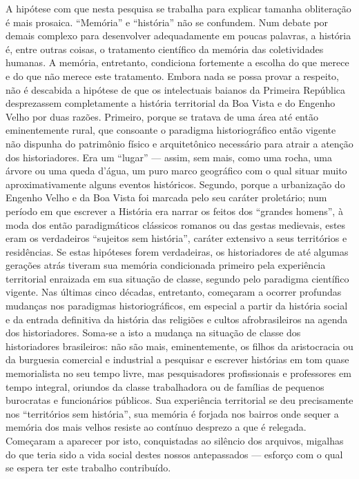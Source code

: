 A hipótese com que nesta pesquisa se trabalha para explicar tamanha obliteração é mais prosaica. ``Memória'' e ``história'' não se confundem. Num debate por demais complexo para desenvolver adequadamente em poucas palavras, a história é, entre outras coisas, o tratamento científico da memória das coletividades humanas. A memória, entretanto, condiciona fortemente a escolha do que merece e do que não merece este tratamento. Embora nada se possa provar a respeito, não é descabida a hipótese de que os intelectuais baianos da Primeira República desprezassem completamente a história territorial da Boa Vista e do Engenho Velho por duas razões. Primeiro, porque se tratava de uma área até então eminentemente rural, que consoante o paradigma historiográfico então vigente não dispunha do patrimônio físico e arquitetônico necessário para atrair a atenção dos historiadores. Era um ``lugar'' --- assim, sem mais, como uma rocha, uma árvore ou uma queda d'água, um puro marco geográfico com o qual situar muito aproximativamente alguns eventos históricos. Segundo, porque a urbanização do Engenho Velho e da Boa Vista foi marcada pelo seu caráter proletário; num período em que escrever a História era narrar os feitos dos ``grandes homens'', à moda dos então paradigmáticos clássicos romanos ou das gestas medievais, estes eram os verdadeiros ``sujeitos sem história'', caráter extensivo a seus territórios e residências. Se estas hipóteses forem verdadeiras, os historiadores de até algumas gerações atrás tiveram sua memória condicionada primeiro pela experiência territorial enraizada em sua situação de classe, segundo pelo paradigma científico vigente. Nas últimas cinco décadas, entretanto, começaram a ocorrer profundas mudanças nos paradigmas historiográficos, em especial a partir da história social e da entrada definitiva da história das religiões e cultos afrobrasileiros na agenda dos historiadores. Soma-se a isto a mudança na situação de classe dos historiadores brasileiros: não são mais, eminentemente, os filhos da aristocracia ou da burguesia comercial e industrial a pesquisar e escrever histórias em tom quase memorialista no seu tempo livre, mas pesquisadores profissionais e professores em tempo integral, oriundos da classe trabalhadora ou de famílias de pequenos burocratas e funcionários públicos. Sua experiência territorial se deu precisamente nos ``territórios sem história'', sua memória é forjada nos bairros onde sequer a memória dos mais velhos resiste ao contínuo desprezo a que é relegada. Começaram a aparecer por isto, conquistadas ao silêncio dos arquivos, migalhas do que teria sido a vida social destes nossos antepassados --- esforço com o qual se espera ter este trabalho contribuído.

